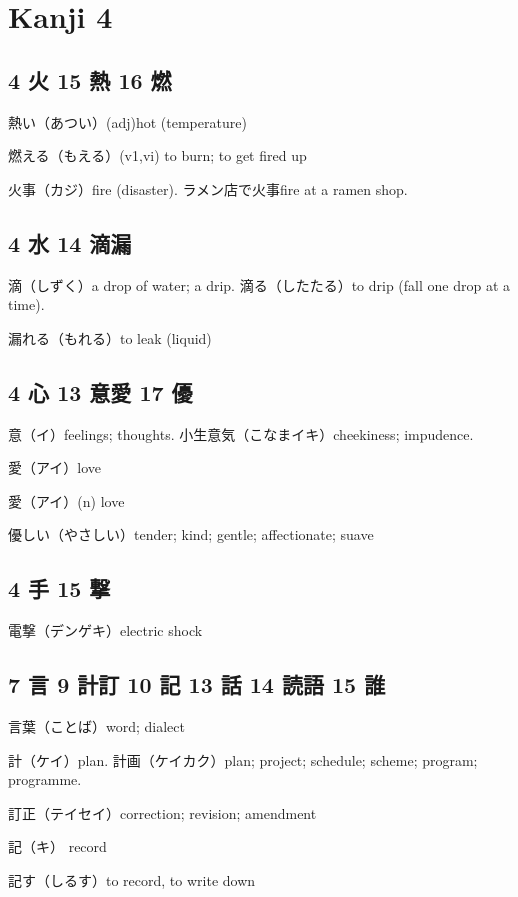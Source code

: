 \chapter{Kanji 4}

\section{4 火 15 熱 16 燃}

熱い（あつい）(adj)hot (temperature)

燃える（もえる）(v1,vi) to burn; to get fired up

火事（カジ）fire (disaster).
ラメン店で火事fire at a ramen shop.

\section{4 水 14 滴漏}

滴（しずく）a drop of water; a drip.
滴る（したたる）to drip (fall one drop at a time).

漏れる（もれる）to leak (liquid)

\section{4 心 13 意愛 17 優}

意（イ）feelings; thoughts.
小生意気（こなまイキ）cheekiness; impudence.

愛（アイ）love

愛（アイ）(n) love

優しい（やさしい）tender; kind; gentle; affectionate; suave

\section{4 手 15 撃}

電撃（デンゲキ）electric shock

\section{7 言 9 計訂 10 記 13 話 14 読語 15 誰}

言葉（ことば）word; dialect

計（ケイ）plan.
計画（ケイカク）plan; project; schedule; scheme; program; programme.

訂正（テイセイ）correction; revision; amendment

記（キ） record

記す（しるす）to record, to write down

